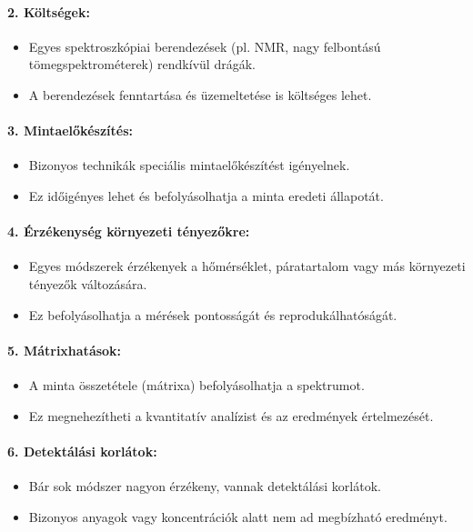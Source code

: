 \documentclass[a4paper,12pt]{article}
\begin{document}
\paragraph{2. Költségek:} \begin{itemize} \item Egyes spektroszkópiai berendezések (pl. NMR, nagy felbontású tömegspektrométerek) rendkívül drágák. \item A berendezések fenntartása és üzemeltetése is költséges lehet. \end{itemize}

\paragraph{3. Mintaelőkészítés:} \begin{itemize} \item Bizonyos technikák speciális mintaelőkészítést igényelnek. \item Ez időigényes lehet és befolyásolhatja a minta eredeti állapotát. \end{itemize}

\paragraph{4. Érzékenység környezeti tényezőkre:} \begin{itemize} \item Egyes módszerek érzékenyek a hőmérséklet, páratartalom vagy más környezeti tényezők változására. \item Ez befolyásolhatja a mérések pontosságát és reprodukálhatóságát. \end{itemize}

\paragraph{5. Mátrixhatások:} \begin{itemize} \item A minta összetétele (mátrixa) befolyásolhatja a spektrumot. \item Ez megnehezítheti a kvantitatív analízist és az eredmények értelmezését. \end{itemize}

\paragraph{6. Detektálási korlátok:} \begin{itemize} \item Bár sok módszer nagyon érzékeny, vannak detektálási korlátok. \item Bizonyos anyagok vagy koncentrációk alatt nem ad megbízható eredményt. \end{itemize}
\end{document}
